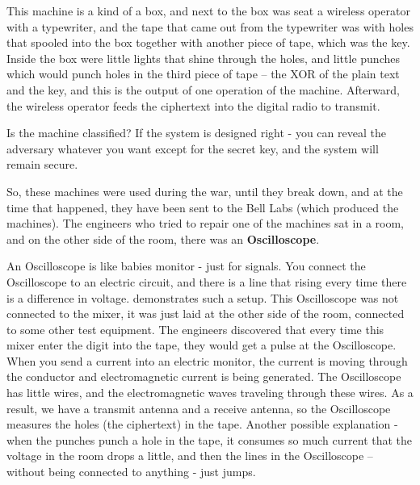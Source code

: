 This machine is a kind of a box, and next to the box was seat a wireless
operator with a typewriter, and the tape that came out from the typewriter was
with holes that spooled into the box together with another piece of tape, which
was the key. Inside the box were little lights that shine through the holes, and
little punches which would punch holes in the third piece of tape – the XOR of
the plain text and the key, and this is the output of one operation of the
machine. Afterward, the wireless operator feeds the ciphertext into the digital
radio to transmit.

Is the machine classified? If the system is designed right - you can reveal the
adversary whatever you want except for the secret key, and the system will
remain secure.

So, these machines were used during the war, until they break down, and at the
time that happened, they have been sent to the Bell Labs (which produced the
machines). The engineers who tried to repair one of the machines sat in a room,
and on the other side of the room, there was an \textbf{Oscilloscope}. 

An Oscilloscope is like babies monitor - just for signals. You connect the
Oscilloscope to an electric circuit, and there is a line that rising every time
there is a difference in voltage.  demonstrates such a setup.
This Oscilloscope was not connected to the mixer, it was just laid at the other
side of the room, connected to some other test equipment. The engineers
discovered that every time this mixer enter the digit into the tape, they would
get a pulse at the Oscilloscope. When you send a current into an electric
monitor, the current is moving through the conductor and electromagnetic current
is being generated. The Oscilloscope has little wires, and the electromagnetic
waves traveling through these wires. As a result, we have a transmit antenna and
a receive antenna, so the Oscilloscope measures the holes (the ciphertext) in
the tape. Another possible explanation - when the punches punch a hole in the
tape, it consumes so much current that the voltage in the room drops a little,
and then the lines in the Oscilloscope – without being connected to anything -
just jumps.

